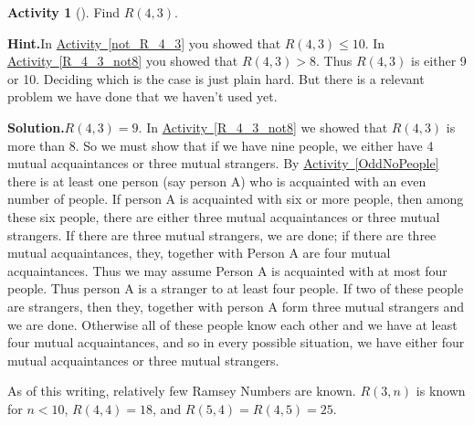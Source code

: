 \documentclass[10pt,]{book}
\theoremstyle{plain}
\theoremstyle{definition}
\newtheorem{activity}[project]{Activity}
\numberwithin{equation}{chapter}
\newcommand{\lt}{<}
\newcommand{\gt}{>}
\begin{document}
\begin{activity}[]\label{activity-71}
Find \(R(4,3)\).%
\par\medskip\noindent%
\textbf{Hint.}\quad In \hyperref[not_R_4_3]{Activity~\ref{not_R_4_3}} you showed that \(R(4, 3) \le 10\). In \hyperref[R_4_3_not8]{Activity~\ref{R_4_3_not8}} you showed that \(R(4, 3) \gt 8\). Thus \(R(4, 3)\) is either 9 or 10. Deciding which is the case is just plain hard. But there is a relevant problem we have done that we haven’t used yet.%
\par\medskip\noindent%
\textbf{Solution.}\quad \(R(4,3)=9\). In \hyperref[R_4_3_not8]{Activity~\ref{R_4_3_not8}} we showed that \(R(4,3)\) is more than 8. So we must show that if we have nine people, we either have 4 mutual acquaintances or three mutual strangers. By \hyperref[OddNoPeople]{Activity~\ref{OddNoPeople}} there is at least one person (say person A) who is acquainted with an even number of people. If person A is acquainted with six or more people, then among these six people, there are either three mutual acquaintances or three mutual strangers. If there are three mutual strangers, we are done; if there are three mutual acquaintances, they, together with Person A are four mutual acquaintances. Thus we may assume Person A is acquainted with at most four people. Thus person A is a stranger to at least four people. If two of these people are strangers, then they, together with person A form three mutual strangers and we are done. Otherwise all of these people know each other and we have at least four mutual acquaintances, and so in every possible situation, we have either four mutual acquaintances or three mutual strangers.%
\end{activity}
As of this writing, relatively few Ramsey Numbers are known. \(R(3,n)\) is known for \(n\lt 10\), \(R(4,4) = 18\), and \(R(5,4)=R(4,5)=25\).%
\typeout{************************************************}
\typeout{************************************************}
\end{document}
